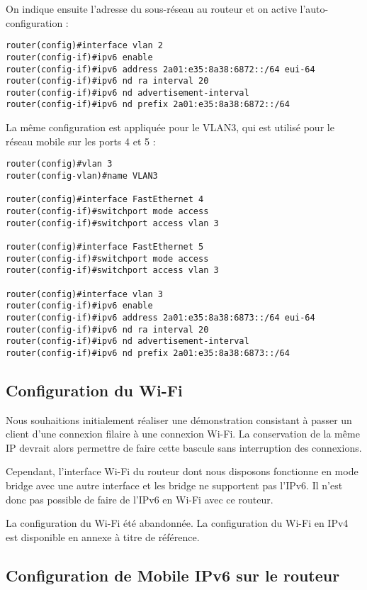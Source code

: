 On indique ensuite l'adresse du sous-réseau au routeur et on active l'auto-configuration :

\begin{lstlisting}
router(config)#interface vlan 2
router(config-if)#ipv6 enable                              
router(config-if)#ipv6 address 2a01:e35:8a38:6872::/64 eui-64
router(config-if)#ipv6 nd ra interval 20
router(config-if)#ipv6 nd advertisement-interval
router(config-if)#ipv6 nd prefix 2a01:e35:8a38:6872::/64
\end{lstlisting}

La même configuration est appliquée pour le VLAN3, qui est utilisé pour le réseau mobile sur les ports 4 et 5 :

\begin{lstlisting}
router(config)#vlan 3
router(config-vlan)#name VLAN3

router(config)#interface FastEthernet 4
router(config-if)#switchport mode access
router(config-if)#switchport access vlan 3

router(config)#interface FastEthernet 5
router(config-if)#switchport mode access
router(config-if)#switchport access vlan 3

router(config)#interface vlan 3
router(config-if)#ipv6 enable       
router(config-if)#ipv6 address 2a01:e35:8a38:6873::/64 eui-64
router(config-if)#ipv6 nd ra interval 20
router(config-if)#ipv6 nd advertisement-interval
router(config-if)#ipv6 nd prefix 2a01:e35:8a38:6873::/64
\end{lstlisting}

\subsection{Configuration du Wi-Fi}

Nous souhaitions initialement réaliser une démonstration consistant à passer un client d'une connexion filaire à une connexion Wi-Fi.
La conservation de la même IP devrait alors permettre de faire cette bascule sans interruption des connexions.

Cependant, l'interface Wi-Fi du routeur dont nous disposons fonctionne en mode bridge avec une autre interface et les bridge ne supportent pas l'IPv6.
Il n'est donc pas possible de faire de l'IPv6 en Wi-Fi avec ce routeur.

La configuration du Wi-Fi été abandonnée.
La configuration du Wi-Fi en IPv4 est disponible en annexe à titre de référence.

\subsection{Configuration de Mobile IPv6 sur le routeur}

